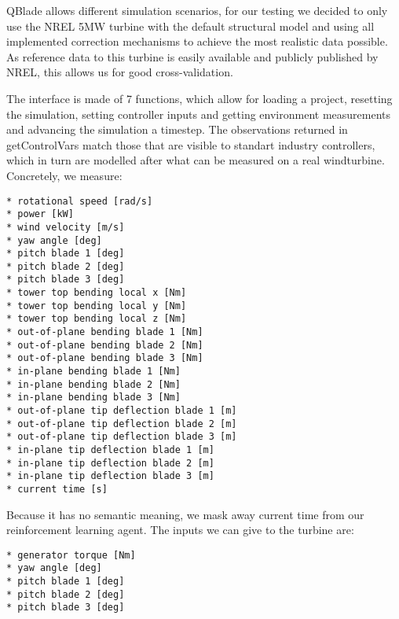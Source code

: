 \documentclass[hyperref,german,beleg]{cgvpub}
\begin{document}
QBlade allows different simulation scenarios, for our testing we decided to only use the NREL 5MW \cite{jonkmanDefinition5MWReference2009} turbine with the default structural model and using all implemented correction mechanisms to achieve the most realistic data possible. As reference data to this turbine is easily available and publicly published by NREL, this allows us for good cross-validation.

The interface is made of 7 functions, which allow for loading a project, resetting the simulation, setting controller inputs and getting environment measurements and advancing the simulation a timestep. The observations returned in getControlVars match those that are visible to standart industry controllers, which in turn are modelled after what can be measured on a real windturbine. Concretely, we measure:
\begin{verbatim}
* rotational speed [rad/s]
* power [kW]
* wind velocity [m/s]
* yaw angle [deg]
* pitch blade 1 [deg]
* pitch blade 2 [deg]
* pitch blade 3 [deg]
* tower top bending local x [Nm]
* tower top bending local y [Nm]
* tower top bending local z [Nm]
* out-of-plane bending blade 1 [Nm]
* out-of-plane bending blade 2 [Nm]
* out-of-plane bending blade 3 [Nm]
* in-plane bending blade 1 [Nm]
* in-plane bending blade 2 [Nm]
* in-plane bending blade 3 [Nm]
* out-of-plane tip deflection blade 1 [m]
* out-of-plane tip deflection blade 2 [m]
* out-of-plane tip deflection blade 3 [m]
* in-plane tip deflection blade 1 [m]
* in-plane tip deflection blade 2 [m]
* in-plane tip deflection blade 3 [m]
* current time [s]
\end{verbatim}

Because it has no semantic meaning, we mask away current time from our reinforcement learning agent. The inputs we can give to the turbine are:
\begin{verbatim}
* generator torque [Nm]
* yaw angle [deg]
* pitch blade 1 [deg]
* pitch blade 2 [deg]
* pitch blade 3 [deg]
\end{verbatim}
\end{document}
